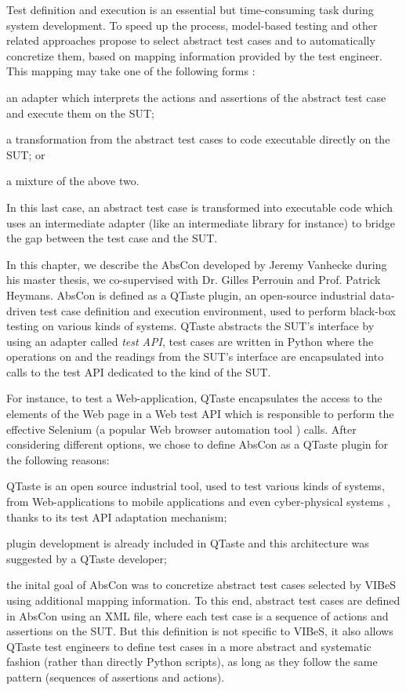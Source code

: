 
Test definition and execution is an essential but time-consuming task during system development. To speed up the process, model-based testing and other related approaches propose to select abstract test cases and to automatically concretize them, based on mapping information provided by the test engineer. This mapping may take one of the following forms \cite{Utting2007}:
\begin{inparaenum}[(i)]
\item an adapter which interprets the actions and assertions of the abstract test case and execute them on the SUT;
\item a transformation from the abstract test cases to code executable directly on the SUT; or
\item a mixture of the above two.
\end{inparaenum}
In this last case, an \gls{abstract test case} is transformed into executable code which uses an intermediate adapter (like an intermediate library for instance) to bridge the gap between the test case and the \gls{SUT}. 

In this chapter, we describe the \acrfull{AbsCon} developed by Jeremy Vanhecke \cite{Vanhecke2016} during his master thesis, we co-supervised with Dr. Gilles Perrouin and Prof. Patrick Heymans. AbsCon is defined as a QTaste \cite{qtaste} plugin, an open-source industrial data-driven test case definition and execution environment, used to perform black-box testing on various kinds of systems. QTaste abstracts the SUT's interface by using an adapter called \emph{test API}, test cases are written in Python where the operations on and the readings from the SUT's interface are encapsulated into calls to the test API dedicated to the kind of the SUT. 

For instance, to test a Web-application, QTaste encapsulates the access to the elements of the Web page in a Web test API which is responsible to perform the effective Selenium (a popular Web browser automation tool \cite{selenium}) calls. After considering different options, we chose to define AbsCon as a QTaste plugin for the following reasons:
\begin{inparaenum}[(i)]
	\item QTaste is an open source industrial tool, used to test various kinds of systems, from Web-applications to mobile applications and even cyber-physical systems \cite{Doucet2014}, thanks to its test API adaptation mechanism;
	\item plugin development is already included in QTaste and this architecture was suggested by a QTaste developer;
	\item the inital goal of AbsCon was to concretize abstract test cases selected by \gls{VIBeS} using additional mapping information. To this end, abstract test cases are defined in AbsCon using an XML file, where each test case is a sequence of actions and assertions on the SUT. But this definition is not specific to VIBeS, it also allows QTaste test engineers to define test cases in a more abstract and systematic fashion (rather than directly Python scripts), as long as they follow the same pattern (\ie sequences of assertions and actions).
\end{inparaenum}

